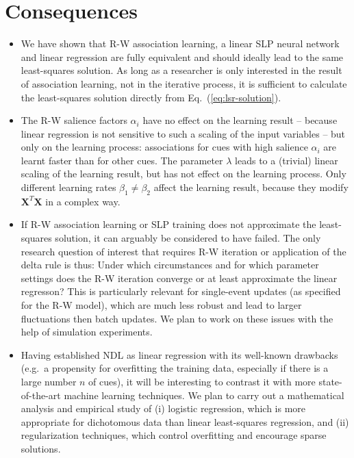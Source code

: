 \documentclass[a4paper,11pt]{article} %
\begin{document}
\section{Consequences}
\label{sec:consequence}

\begin{itemize}

\item We have shown that R-W association learning, a linear SLP neural network and linear regression are fully equivalent and should ideally lead to the same least-squares solution.  As long as a researcher is only interested in the result of association learning, not in the iterative process, it is sufficient to calculate the least-squares solution directly from Eq.~(\ref{eq:lsr-solution}).

\item The R-W salience factors $\alpha_i$ have no effect on the learning result -- because linear regression is not sensitive to such a scaling of the input variables -- but only on the learning process: associations for cues with high salience $\alpha_i$ are learnt faster than for other cues.  The parameter $\lambda$ leads to a (trivial) linear scaling of the learning result, but has not effect on the learning process.  Only different learning rates $\beta_1\neq \beta_2$ affect the learning result, because they modify $\mathbf{X}^T \mathbf{X}$ in a complex way.

\item If R-W association learning or SLP training does not approximate the least-squares solution, it can arguably be considered to have failed.  The only research question of interest that requires R-W iteration or application of the delta rule is thus: Under which circumstances and for which parameter settings does the R-W iteration converge or at least approximate the linear regresson? This is particularly relevant for single-event updates (as specified for the R-W model), which are much less robust and lead to larger fluctuations then batch updates.  We plan to work on these issues with the help of simulation experiments.  

\item Having established NDL as linear regression with its well-known drawbacks (e.g.\ a propensity for overfitting the training data, especially if there is a large number $n$ of cues), it will be interesting to contrast it with more state-of-the-art machine learning techniques.  We plan to carry out a mathematical analysis and empirical study of (i) logistic regression, which is more appropriate for dichotomous data than linear least-squares regression, and (ii) regularization techniques, which control overfitting and encourage sparse solutions.

\end{itemize}


\end{document}
